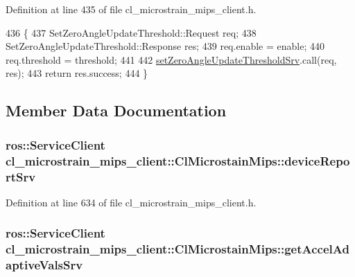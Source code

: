 Definition at line 435 of file cl\+\_\+microstrain\+\_\+mips\+\_\+client.\+h.


\begin{DoxyCode}
436     \{
437         SetZeroAngleUpdateThreshold::Request req;
438         SetZeroAngleUpdateThreshold::Response res;
439         req.enable = enable;
440         req.threshold = threshold;
441 
442         \hyperlink{classcl__microstrain__mips__client_1_1ClMicrostainMips_a44d26e3c3ec005e1a8c04c40c7ef49f3}{setZeroAngleUpdateThresholdSrv}.call(req, res);
443         \textcolor{keywordflow}{return} res.success;
444     \}
\end{DoxyCode}


\subsection{Member Data Documentation}
\subsubsection[{\texorpdfstring{device\+Report\+Srv}{deviceReportSrv}}]{\setlength{\rightskip}{0pt plus 5cm}ros\+::\+Service\+Client cl\+\_\+microstrain\+\_\+mips\+\_\+client\+::\+Cl\+Microstain\+Mips\+::device\+Report\+Srv\hspace{0.3cm}{\ttfamily [protected]}}\hypertarget{classcl__microstrain__mips__client_1_1ClMicrostainMips_ae71bb4d3b205bde7752e27ccb0232e87}{}\label{classcl__microstrain__mips__client_1_1ClMicrostainMips_ae71bb4d3b205bde7752e27ccb0232e87}


Definition at line 634 of file cl\+\_\+microstrain\+\_\+mips\+\_\+client.\+h.

\subsubsection[{\texorpdfstring{get\+Accel\+Adaptive\+Vals\+Srv}{getAccelAdaptiveValsSrv}}]{\setlength{\rightskip}{0pt plus 5cm}ros\+::\+Service\+Client cl\+\_\+microstrain\+\_\+mips\+\_\+client\+::\+Cl\+Microstain\+Mips\+::get\+Accel\+Adaptive\+Vals\+Srv\hspace{0.3cm}{\ttfamily [protected]}}\hypertarget{classcl__microstrain__mips__client_1_1ClMicrostainMips_a237ad9bcfa0cb65da14183c8c7a5f7fb}{}\label{classcl__microstrain__mips__client_1_1ClMicrostainMips_a237ad9bcfa0cb65da14183c8c7a5f7fb}


